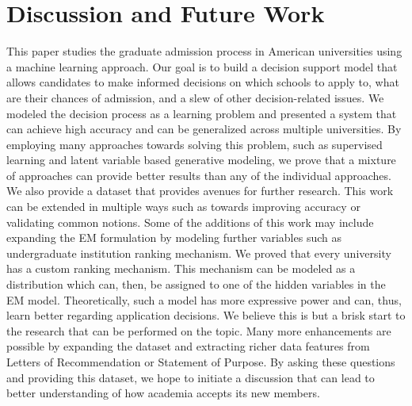 \documentclass{sig-alternate-05-2015}
\begin{document}
\section{Discussion and Future Work}
\label{sec:discussion}
This paper studies the graduate admission process in American universities using a machine learning approach. Our goal is to build a decision support model that allows candidates to make informed decisions on which schools to apply to, what are their chances of admission, and a slew of other decision-related issues. We modeled the decision process as a learning problem and presented a system that can achieve high accuracy and can be generalized across multiple universities. By employing many approaches towards solving this problem, such as supervised learning and latent variable based generative modeling, we prove that a mixture of approaches can provide better results than any of the individual approaches. We also provide a dataset that provides avenues for further research. This work can be extended in multiple ways such as towards improving accuracy or validating common notions. Some of the additions of this work may include expanding the EM formulation by modeling further variables such as undergraduate institution ranking mechanism. We proved that every university has a custom ranking mechanism. This mechanism can be modeled as a distribution which can, then, be assigned to one of the hidden variables in the EM model. Theoretically, such a model has more expressive power and can, thus, learn better regarding application decisions. We believe this is but a brisk start to the research that can be performed on the topic. Many more enhancements are possible by expanding the dataset and extracting richer data features from Letters of Recommendation or Statement of Purpose. By asking these questions and providing this dataset, we hope to initiate a discussion that can lead to better understanding of how academia accepts its new members.


%

%
%
\end{document}

